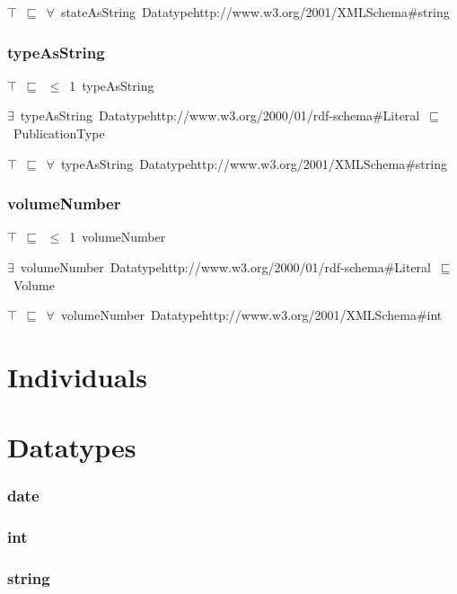 \documentclass{article}
\begin{document}
\ensuremath{\top}~\ensuremath{\sqsubseteq}~\ensuremath{\forall}~stateAsString~Datatypehttp://www.w3.org/2001/XMLSchema#string

\subsubsection*{typeAsString}

\ensuremath{\top}~\ensuremath{\sqsubseteq}~\ensuremath{\leq}~1~typeAsString

\ensuremath{\exists}~typeAsString~Datatypehttp://www.w3.org/2000/01/rdf-schema#Literal~\ensuremath{\sqsubseteq}~PublicationType

\ensuremath{\top}~\ensuremath{\sqsubseteq}~\ensuremath{\forall}~typeAsString~Datatypehttp://www.w3.org/2001/XMLSchema#string

\subsubsection*{volumeNumber}

\ensuremath{\top}~\ensuremath{\sqsubseteq}~\ensuremath{\leq}~1~volumeNumber

\ensuremath{\exists}~volumeNumber~Datatypehttp://www.w3.org/2000/01/rdf-schema#Literal~\ensuremath{\sqsubseteq}~Volume

\ensuremath{\top}~\ensuremath{\sqsubseteq}~\ensuremath{\forall}~volumeNumber~Datatypehttp://www.w3.org/2001/XMLSchema#int

\section*{Individuals}\section*{Datatypes}\subsubsection*{date}

\subsubsection*{int}

\subsubsection*{string}
\end{document}
